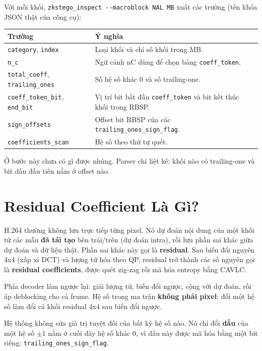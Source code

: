 \documentclass[11pt,a4paper]{article}
\begin{document}
Với mỗi khối, \texttt{zkstego\_inspect -{}-macroblock NAL MB} xuất các trường
(tên khóa JSON thật của công cụ):

\begin{center}
\begin{tabular}{lp{95mm}}
\toprule
Trường & Ý nghĩa \\
\midrule
\texttt{category}, \texttt{index} & Loại khối và chỉ số khối trong MB. \\
\texttt{n\_c} & Ngữ cảnh nC dùng để chọn bảng \texttt{coeff\_token}. \\
\texttt{total\_coeff}, \texttt{trailing\_ones} & Số hệ số khác 0 và số trailing-one. \\
\texttt{coeff\_token\_bit}, \texttt{end\_bit} & Vị trí bit bắt đầu \texttt{coeff\_token} và bit kết thúc khối trong RBSP. \\
\texttt{sign\_offsets} & Offset bit RBSP của các \texttt{trailing\_ones\_sign\_flag}. \\
\texttt{coefficients\_scan} & Hệ số theo thứ tự quét. \\
\bottomrule
\end{tabular}
\end{center}

Ở bước này chưa có gì được nhúng. Parser chỉ liệt kê: khối nào có trailing-one và
bit dấu đầu tiên nằm ở offset nào.

\section{Residual Coefficient Là Gì?}

H.264 thường không lưu trực tiếp từng pixel. Nó dự đoán nội dung của một khối từ
các mẫu \textbf{đã tái tạo} bên trái/trên (dự đoán intra), rồi lưu phần sai khác
giữa dự đoán và dữ liệu thật. Phần sai khác này gọi là \textbf{residual}. Sau biến
đổi nguyên 4x4 (xấp xỉ DCT) và lượng tử hóa theo QP, residual trở thành các số
nguyên gọi là \textbf{residual coefficients}, được quét zig-zag rồi mã hóa entropy
bằng CAVLC.

Phía decoder làm ngược lại: giải lượng tử, biến đổi ngược, cộng với dự đoán, rồi áp
deblocking cho cả frame. Hệ số trong ma trận \textbf{không phải pixel}: đổi một hệ
số làm đổi cả khối residual 4x4 sau biến đổi ngược.

Hệ thống không sửa giá trị tuyệt đối của bất kỳ hệ số nào. Nó chỉ đổi \textbf{dấu}
của một hệ số \(\pm1\) nằm ở cuối dãy hệ số khác 0, vì dấu này được mã hóa bằng
một bit riêng: \texttt{trailing\_ones\_sign\_flag}.
\end{document}

